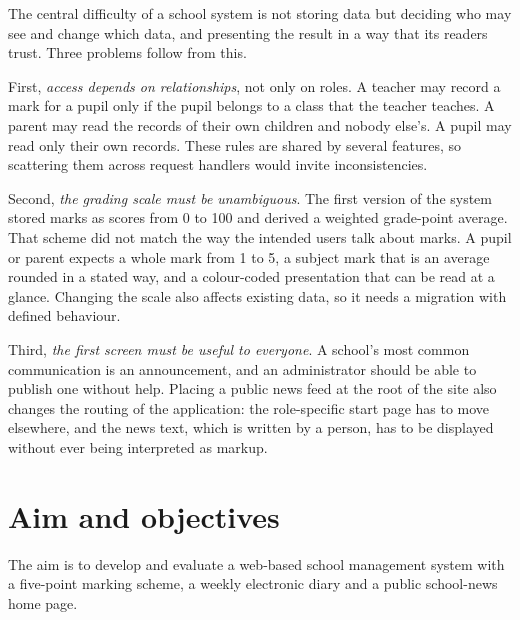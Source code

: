 The central difficulty of a school system is not storing data but deciding who may see and change which data, and presenting the result in a way that its readers trust. Three problems follow from this.

First, \emph{access depends on relationships}, not only on roles. A teacher may record a mark for a pupil only if the pupil belongs to a class that the teacher teaches. A parent may read the records of their own children and nobody else's. A pupil may read only their own records. These rules are shared by several features, so scattering them across request handlers would invite inconsistencies.

Second, \emph{the grading scale must be unambiguous}. The first version of the system stored marks as scores from 0 to 100 and derived a weighted grade-point average. That scheme did not match the way the intended users talk about marks. A pupil or parent expects a whole mark from 1 to 5, a subject mark that is an average rounded in a stated way, and a colour-coded presentation that can be read at a glance. Changing the scale also affects existing data, so it needs a migration with defined behaviour.

Third, \emph{the first screen must be useful to everyone}. A school's most common communication is an announcement, and an administrator should be able to publish one without help. Placing a public news feed at the root of the site also changes the routing of the application: the role-specific start page has to move elsewhere, and the news text, which is written by a person, has to be displayed without ever being interpreted as markup.

\section{Aim and objectives}

The aim is to develop and evaluate a web-based school management system with a five-point marking scheme, a weekly electronic diary and a public school-news home page.

